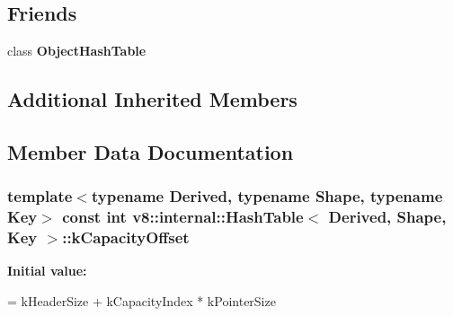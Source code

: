\subsection*{Friends}
\begin{DoxyCompactItemize}
\item 
\hypertarget{classv8_1_1internal_1_1_hash_table_ac26f85b18a3d4e9b953069cc69ab9a9f}{}class {\bfseries Object\+Hash\+Table}\label{classv8_1_1internal_1_1_hash_table_ac26f85b18a3d4e9b953069cc69ab9a9f}

\end{DoxyCompactItemize}
\subsection*{Additional Inherited Members}


\subsection{Member Data Documentation}
\hypertarget{classv8_1_1internal_1_1_hash_table_a7ed978a6c4e826d387ef137a9734f88a}{}
\subsubsection[{k\+Capacity\+Offset}]{\setlength{\rightskip}{0pt plus 5cm}template$<$typename Derived, typename Shape, typename Key$>$ const int {\bf v8\+::internal\+::\+Hash\+Table}$<$ Derived, Shape, Key $>$\+::k\+Capacity\+Offset\hspace{0.3cm}{\ttfamily [static]}}\label{classv8_1_1internal_1_1_hash_table_a7ed978a6c4e826d387ef137a9734f88a}
{\bfseries Initial value\+:}
\begin{DoxyCode}
=
      kHeaderSize + kCapacityIndex * kPointerSize
\end{DoxyCode}
\hypertarget{classv8_1_1internal_1_1_hash_table_a2e2b830482a0692ffc3ffd22dcfa07df}{}
